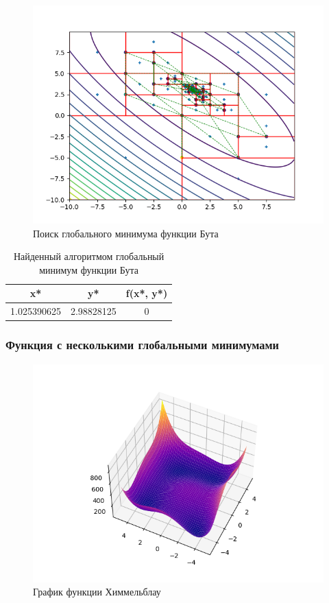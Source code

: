 \begin{figure}[H]
	\centering
		\includegraphics{task2/resources/Figure_2.png}
	\caption{Поиск глобального минимума функции Бута}
	\label{w_pert}
\end{figure}

\begin{table}[H]
	\centering
	\begin{tabular}{| c | c | c |}
		\hline
		    x* & y* & f(x*, y*) \\
		\hline
		    1.025390625 & 2.98828125 & 0 \\
   		\hline
	\end{tabular}
	\caption{Найденный алгоритмом глобальный минимум функции Бута}
\end{table}

\newpage
\subsubsection{Функция с несколькими глобальными минимумами}

\begin{figure}[H]
		\centering
			\includegraphics{task2/resources/Figure_3.png}
		\caption{График функции Химмельблау}
		\label{w_pert}
	\end{figure}

